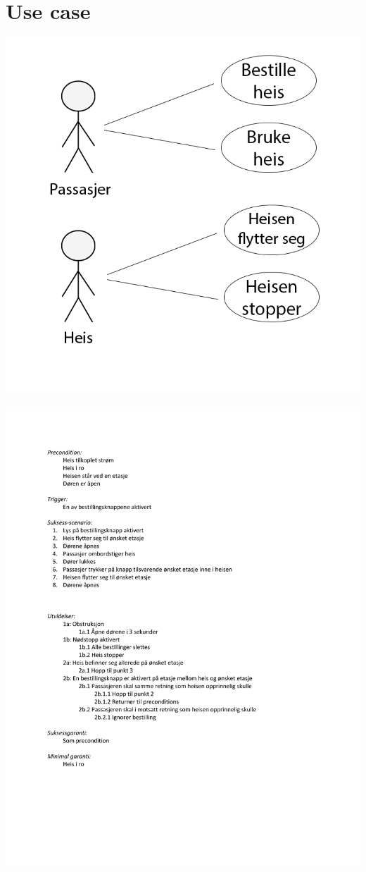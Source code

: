 \documentclass[10pt,a4paper]{article}
\begin{document}
\section{Use case}
\begin{center}
\includegraphics[scale=2]{usecase.png}
\end{center}
\includegraphics[scale=0.95]{usecase.pdf}
\end{document}
